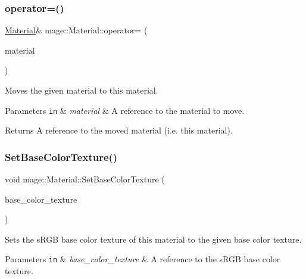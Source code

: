 \subsubsection{\texorpdfstring{operator=()}{operator=()}\hspace{0.1cm}{\footnotesize\ttfamily [2/2]}}
{\footnotesize\ttfamily \hyperlink{classmage_1_1_material}{Material}\& mage\+::\+Material\+::operator= (\begin{DoxyParamCaption}\item[{\hyperlink{classmage_1_1_material}{Material} \&\&}]{material }\end{DoxyParamCaption})\hspace{0.3cm}{\ttfamily [default]}}

Moves the given material to this material.


\begin{DoxyParams}[1]{Parameters}
\mbox{\tt in}  & {\em material} & A reference to the material to move. \\
\hline
\end{DoxyParams}
\begin{DoxyReturn}{Returns}
A reference to the moved material (i.\+e. this material). 
\end{DoxyReturn}
\hypertarget{classmage_1_1_material_add87c1ebf7783980ac21e986c080505b}{}\label{classmage_1_1_material_add87c1ebf7783980ac21e986c080505b} 
\subsubsection{\texorpdfstring{Set\+Base\+Color\+Texture()}{SetBaseColorTexture()}}
{\footnotesize\ttfamily void mage\+::\+Material\+::\+Set\+Base\+Color\+Texture (\begin{DoxyParamCaption}\item[{const \hyperlink{namespacemage_a1e01ae66713838a7a67d30e44c67703e}{Shared\+Ptr}$<$ const \hyperlink{classmage_1_1_texture}{Texture} $>$ \&}]{base\+\_\+color\+\_\+texture }\end{DoxyParamCaption})}

Sets the s\+R\+GB base color texture of this material to the given base color texture.


\begin{DoxyParams}[1]{Parameters}
\mbox{\tt in}  & {\em base\+\_\+color\+\_\+texture} & A reference to the s\+R\+GB base color texture. \\
\hline
\end{DoxyParams}
\hypertarget{classmage_1_1_material_a9b0bcb448cf9c96bcb63dcbc0f110bd1}{}\label{classmage_1_1_material_a9b0bcb448cf9c96bcb63dcbc0f110bd1} 
